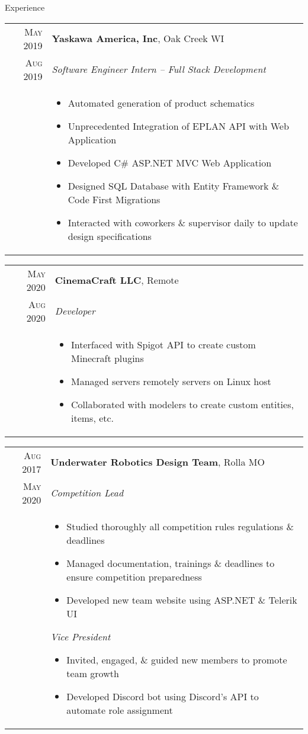 \documentclass{resume}
\begin{document}
\begin{rSection}{Experience}
\small
{
    \begin{tabular}{r|p{15cm}}
        \textsc{May 2019} & \textbf{Yaskawa America, Inc}, Oak Creek WI \\
        \textsc{Aug 2019}  & \textit{Software Engineer Intern – Full Stack Development} \\ &
        \begin{itemize}
            \item {Automated generation of product schematics}
            \item {Unprecedented Integration of EPLAN API with Web Application}
            \item {Developed C\# ASP.NET MVC Web Application}
            \item {Designed SQL Database with Entity Framework \& Code First Migrations}
            \item {Interacted with coworkers \& supervisor daily to update design specifications}
        \end{itemize}
    \end{tabular}

    \begin{tabular}{r|p{15cm}}
        \textsc{May 2020} & \textbf{CinemaCraft LLC}, Remote \\
        \textsc{Aug 2020}  & \textit{Developer} \\ &
        \begin{itemize}
            \item {Interfaced with Spigot API to create custom Minecraft plugins}
            \item {Managed servers remotely servers on Linux host}
            \item {Collaborated with modelers to create custom entities, items, etc.}
        \end{itemize}
    \end{tabular}

    \begin{tabular}{r|p{15cm}}
        \textsc{Aug 2017} & \textbf{Underwater Robotics Design Team}, Rolla MO \\
        \textsc{May 2020}  & \textit{Competition Lead} \\ &
        \begin{itemize}
            \item {Studied thoroughly all competition rules regulations \& deadlines}
            \item {Managed documentation, trainings \& deadlines to ensure competition preparedness}
            \item {Developed new team website using ASP.NET \& Telerik UI}
        \end{itemize}
        \textit{Vice President}
        \begin{itemize}
            \item {Invited, engaged, \& guided new members to promote team growth}
            \item {Developed Discord bot using Discord's API to automate role assignment}
        \end{itemize}
    \end{tabular}

}
\end{rSection}
\end{document}
